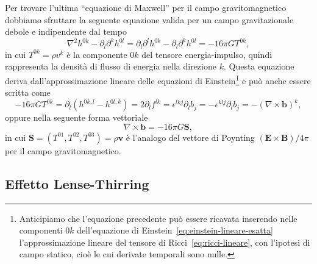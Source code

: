 Per trovare l'ultima ``equazione di Maxwell'' per il campo gravitomagnetico
dobbiamo sfruttare la seguente equazione valida per un campo gravitazionale
debole e indipendente dal tempo
\begin{equation}
  \nabla^{2}h^{0k} - \partial_{l}\partial^{k} h^{0l} = \partial_{l}\partial^{l}
  h^{0k} - \partial_{l}\partial^{k} h^{0l} = -16\pi GT^{0k},
\end{equation}
in cui $T^{0k} = \rho v^{k}$ è la componente $0k$ del tensore energia-impulso,
quindi rappresenta la densità di flusso di energia nella direzione $k$.  Questa
equazione deriva dall'approssimazione lineare delle equazioni di
Einstein\footnote{Anticipiamo che l'equazione precedente può essere ricavata
  inserendo nelle componenti $0k$ dell'equazione di
  Einstein~\eqref{eq:einstein-lineare-esatta} l'approssimazione lineare del
  tensore di Ricci~\eqref{eq:ricci-lineare}, con l'ipotesi di campo statico,
  cioè le cui derivate temporali sono nulle.}  e può anche essere scritta come
\begin{equation}
  -16\pi GT^{0k} = \partial_{l}(h^{0k,l} - h^{0l,k}) = 2\partial_{l}f^{lk} =
  \epsilon^{lkj}\partial_{l}b_{j} = -\epsilon^{klj}\partial_{l}b_{j} = -(\nabla
  \times \bm{b})^{k},
\end{equation}
oppure nella seguente forma vettoriale
\begin{equation}
  \nabla \times \bm{b} = - 16\pi G \bm{S},
\end{equation}
in cui $\bm{S} = (T^{01}, T^{02}, T^{03}) = \rho \bm{v}$ è l'analogo del
vettore di Poynting $(\bm{E}\times\bm{B})/4\pi$ per
il campo gravitomagnetico.

\subsection{Effetto Lense-Thirring}
\label{sec:effetto-lense-thirring}

